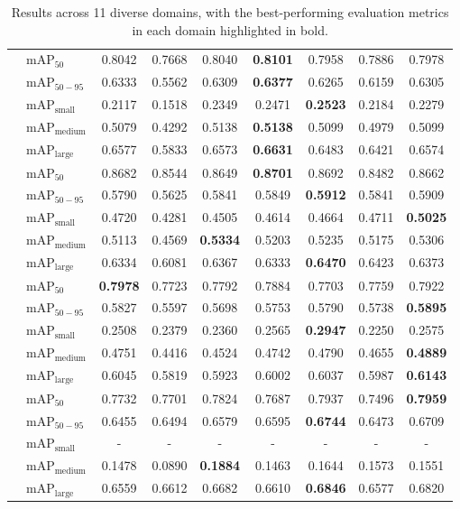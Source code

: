 \documentclass[runningheads]{llncs}
\begin{document}
\begin{table}
\begin{tabular}{>{\centering\arraybackslash}p{1.8cm}lccccccc}
\\
\hline
\multirow{5}{*}{Retail}
 & mAP$_{50}$ & 0.8042 & 0.7668 & 0.8040 & \textbf{0.8101}& 0.7958 & 0.7886 & 0.7978 
\\
 & mAP$_{50-95}$ & 0.6333 & 0.5562 & 0.6309 & \textbf{0.6377}& 0.6265 & 0.6159 & 0.6305 
\\
 & mAP$_{\text{small}}$ & 0.2117 & 0.1518 & 0.2349 & 0.2471 & \textbf{0.2523}& 0.2184 & 0.2279 
\\
 & mAP$_{\text{medium}}$ & 0.5079 & 0.4292 & 0.5138& \textbf{0.5138}& 0.5099 & 0.4979 & 0.5099 
\\
 & mAP$_{\text{large}}$ & 0.6577 & 0.5833 & 0.6573 & \textbf{0.6631}& 0.6483 & 0.6421 & 0.6574 
\\
\hline
\multirow{5}{*}{Security}
 & mAP$_{50}$ & 0.8682 & 0.8544 & 0.8649 & \textbf{0.8701}& 0.8692 & 0.8482 & 0.8662 
\\
 & mAP$_{50-95}$ & 0.5790 & 0.5625 & 0.5841 & 0.5849 & \textbf{0.5912}& 0.5841 & 0.5909 
\\
 & mAP$_{\text{small}}$ & 0.4720 & 0.4281 & 0.4505 & 0.4614 & 0.4664 & 0.4711 & \textbf{0.5025}\\
 & mAP$_{\text{medium}}$ & 0.5113 & 0.4569 & \textbf{0.5334}& 0.5203 & 0.5235 & 0.5175 & 0.5306 
\\
 & mAP$_{\text{large}}$ & 0.6334 & 0.6081 & 0.6367 & 0.6333 & \textbf{0.6470}& 0.6423 & 0.6373 
\\
\hline
\multirow{5}{*}{Underwater}
 & mAP$_{50}$ & \textbf{0.7978}& 0.7723 & 0.7792 & 0.7884 & 0.7703 & 0.7759 & 0.7922\\
 & mAP$_{50-95}$ & 0.5827 & 0.5597 & 0.5698 & 0.5753 & 0.5790 & 0.5738 & \textbf{0.5895}\\
 & mAP$_{\text{small}}$ & 0.2508 & 0.2379 & 0.2360 & 0.2565 & \textbf{0.2947}& 0.2250 & 0.2575 
\\
 & mAP$_{\text{medium}}$ & 0.4751 & 0.4416 & 0.4524 & 0.4742 & 0.4790 & 0.4655 & \textbf{0.4889}\\
 & mAP$_{\text{large}}$ & 0.6045 & 0.5819 & 0.5923 & 0.6002 & 0.6037 & 0.5987 & \textbf{0.6143}\\
\hline
\multirow{5}{*}{Wildlife}
 & mAP$_{50}$ & 0.7732 & 0.7701 & 0.7824 & 0.7687 & 0.7937 & 0.7496 & \textbf{0.7959}\\
 & mAP$_{50-95}$ & 0.6455 & 0.6494 & 0.6579 & 0.6595 & \textbf{0.6744}& 0.6473 & 0.6709 
\\
 & mAP$_{\text{small}}$ & -& -& -& -& -& -& -\\
 & mAP$_{\text{medium}}$ & 0.1478 & 0.0890 & \textbf{0.1884}& 0.1463 & 0.1644 & 0.1573 & 0.1551 
\\
 & mAP$_{\text{large}}$ & 0.6559 & 0.6612 & 0.6682 & 0.6610 & \textbf{0.6846}& 0.6577 & 0.6820 
\\
\hline
\end{tabular}

\caption{Results across 11 diverse domains, with the best-performing evaluation metrics in each domain highlighted in bold.}
\label{tab:domain_results}
\end{table}
\end{document}
